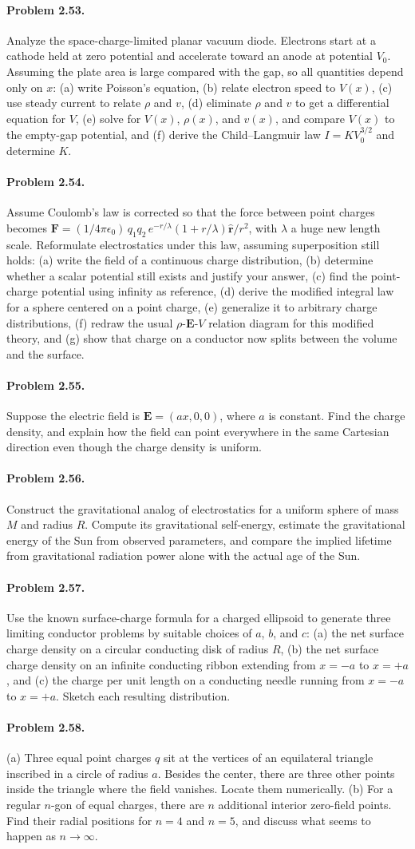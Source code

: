 \documentclass{aa}
\newcommand{\problemstatement}[2]{%
\paragraph{Problem #1.}#2\par\medskip
}
\begin{document}
\problemstatement{2.53}{Analyze the space-charge-limited planar vacuum diode. Electrons start at a cathode held at zero potential and accelerate toward an anode at potential \(V_0\). Assuming the plate area is large compared with the gap, so all quantities depend only on \(x\): (a) write Poisson's equation, (b) relate electron speed to \(V(x)\), (c) use steady current to relate \(\rho\) and \(v\), (d) eliminate \(\rho\) and \(v\) to get a differential equation for \(V\), (e) solve for \(V(x)\), \(\rho(x)\), and \(v(x)\), and compare \(V(x)\) to the empty-gap potential, and (f) derive the Child--Langmuir law \(I=K V_0^{3/2}\) and determine \(K\).}
\problemstatement{2.54}{Assume Coulomb's law is corrected so that the force between point charges becomes \(\mathbf F = (1/4\pi\epsilon_0)\, q_1q_2\, e^{-r/\lambda}(1+r/\lambda)\hat{\mathbf r}/r^2\), with \(\lambda\) a huge new length scale. Reformulate electrostatics under this law, assuming superposition still holds: (a) write the field of a continuous charge distribution, (b) determine whether a scalar potential still exists and justify your answer, (c) find the point-charge potential using infinity as reference, (d) derive the modified integral law for a sphere centered on a point charge, (e) generalize it to arbitrary charge distributions, (f) redraw the usual \(\rho\)-\(\mathbf E\)-\(V\) relation diagram for this modified theory, and (g) show that charge on a conductor now splits between the volume and the surface.}
\problemstatement{2.55}{Suppose the electric field is \(\mathbf E=(ax,0,0)\), where \(a\) is constant. Find the charge density, and explain how the field can point everywhere in the same Cartesian direction even though the charge density is uniform.}
\problemstatement{2.56}{Construct the gravitational analog of electrostatics for a uniform sphere of mass \(M\) and radius \(R\). Compute its gravitational self-energy, estimate the gravitational energy of the Sun from observed parameters, and compare the implied lifetime from gravitational radiation power alone with the actual age of the Sun.}
\problemstatement{2.57}{Use the known surface-charge formula for a charged ellipsoid to generate three limiting conductor problems by suitable choices of \(a\), \(b\), and \(c\): (a) the net surface charge density on a circular conducting disk of radius \(R\), (b) the net surface charge density on an infinite conducting ribbon extending from \(x=-a\) to \(x=+a\), and (c) the charge per unit length on a conducting needle running from \(x=-a\) to \(x=+a\). Sketch each resulting distribution.}
\problemstatement{2.58}{(a) Three equal point charges \(q\) sit at the vertices of an equilateral triangle inscribed in a circle of radius \(a\). Besides the center, there are three other points inside the triangle where the field vanishes. Locate them numerically. (b) For a regular \(n\)-gon of equal charges, there are \(n\) additional interior zero-field points. Find their radial positions for \(n=4\) and \(n=5\), and discuss what seems to happen as \(n\to\infty\).}
\end{document}
